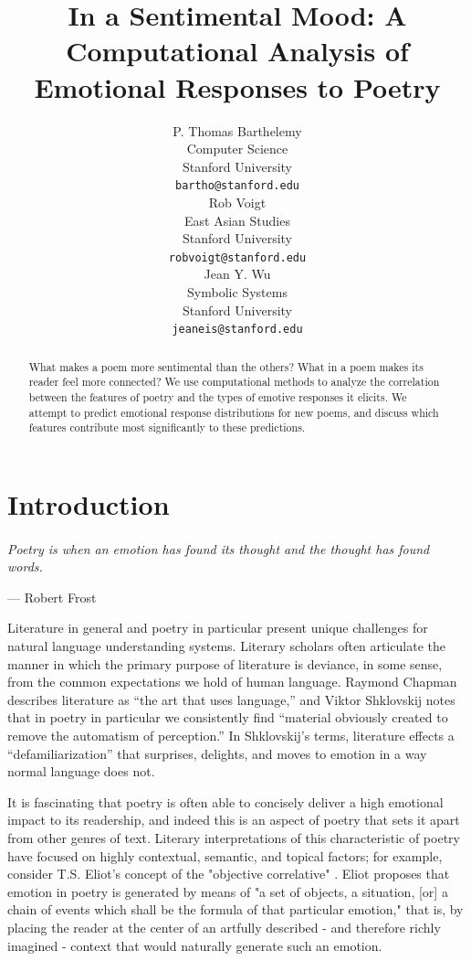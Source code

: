 \documentclass[11pt]{article}
\title{In a Sentimental Mood: A Computational Analysis of Emotional Responses to Poetry}
\author{P. Thomas Barthelemy \\
  Computer Science\\
  Stanford University \\
  {\tt bartho@stanford.edu} \\\And
  Rob Voigt \\
  East Asian Studies \\
  Stanford University \\
  {\tt robvoigt@stanford.edu} \\\And
  Jean Y. Wu \\
  Symbolic Systems  \\
  Stanford University\\
  {\tt jeaneis@stanford.edu} \\}
\date{}
\begin{document}
\maketitle
\begin{abstract}
What makes a poem more sentimental than the others? What in a poem makes its reader feel more connected? We use computational methods to analyze the correlation between the features of poetry and the types of emotive responses it elicits.
We attempt to predict emotional response distributions for new poems, and discuss which features contribute most significantly to these predictions.
\end{abstract}

\section{Introduction}

\paragraph{}
\emph{Poetry is when an emotion has found its thought and the thought has found words.}
\begin{flushright}
--- Robert Frost\\
\end{flushright}


Literature in general and poetry in particular present unique challenges for natural language understanding systems. Literary scholars often articulate the manner in which the primary purpose of literature is deviance, in some sense, from the common expectations we hold of human language. Raymond Chapman describes literature as ``the art that uses language,'' and Viktor Shklovskij notes that in poetry in particular we consistently find ``material obviously created to remove the automatism of perception.'' In Shklovskij's terms, literature effects a ``defamiliarization'' that surprises, delights, and moves to emotion in a way normal language does not.

It is fascinating that poetry is often able to concisely deliver a high emotional impact to its readership, and indeed this is an aspect of poetry that sets it apart from other genres of text. Literary interpretations of this characteristic of poetry have focused on highly contextual, semantic, and topical factors; for example, consider T.S. Eliot's concept of the "objective correlative" \cite{eliot}. Eliot proposes that emotion in poetry is generated by means of "a set of objects, a situation, [or] a chain of events which shall be the formula of that particular emotion," that is, by placing the reader at the center of an artfully described - and therefore richly imagined - context that would naturally generate such an emotion.
\end{document}
